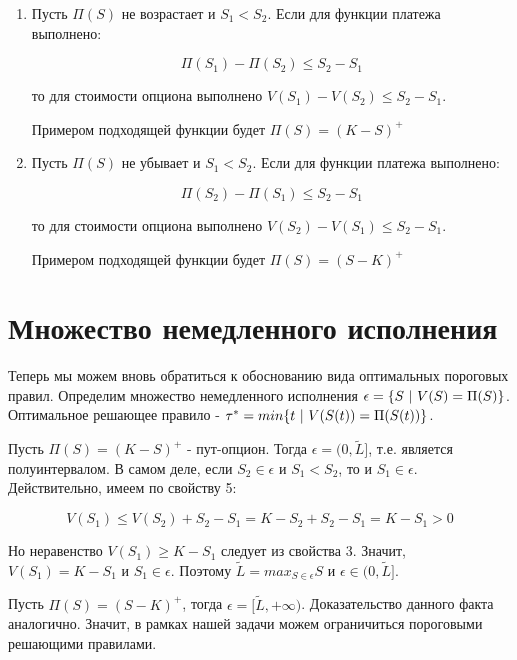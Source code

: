 \documentclass[a4paper,12pt]{article}
\theoremstyle{definition}
\begin{document}
\begin{enumerate}
    \item Пусть $\Pi (S)$ не возрастает и $S_1 < S_2$. Если для функции платежа выполнено:

    \begin{equation*}
        \Pi (S_1) - \Pi (S_2) \le S_2 - S_1
    \end{equation*}
    
    то для стоимости опциона выполнено $V (S_1) - V (S_2) \le S_2 - S_1$.
    
    Примером подходящей функции будет $\Pi (S) = (K - S)^{+}$
    
    \item Пусть $\Pi (S)$ не убывает и $S_1 < S_2$. Если для функции платежа выполнено:

    \begin{equation*}
        \Pi (S_2) - \Pi (S_1) \le S_2 - S_1
    \end{equation*}
    
    то для стоимости опциона выполнено $V (S_2) - V (S_1) \le S_2 - S_1$.
    
    Примером подходящей функции будет $\Pi (S) = (S - K)^{+}$
\end{enumerate}

\section{Множество немедленного исполнения}

Теперь мы можем вновь обратиться к обоснованию вида оптимальных пороговых правил. Определим множество немедленного исполнения $\epsilon = \{S\textup{ | }V(S) = \Pi (S)\}$. Оптимальное решающее правило - $\tau^{*} = min \{t\textup{ | }V(S(t)) = \Pi (S(t)) \}$.

Пусть $\Pi (S) = (K - S)^{+}$ - пут-опцион. Тогда $\epsilon = (0, \tilde{L}]$, т.е. является полуинтервалом. В самом деле, если $S_2 \in \epsilon$ и $S_1 < S_2$, то и $S_1 \in \epsilon$. Действительно, имеем по свойству 5:

\begin{equation*}
    V (S_1) \le V(S_2) + S_2 - S_1 = K - S_2 + S_2 - S_1 = K - S_1 > 0
\end{equation*}

Но неравенство $V(S_1) \ge K - S_1$ следует из свойства 3. Значит, $V(S_1) = K - S_1$ и $S_1 \in \epsilon$. Поэтому $\tilde{L} = max_{S \in \epsilon} S$ и $\epsilon \in (0, \tilde{L}]$.

Пусть $\Pi (S) = (S - K)^{+}$, тогда $\epsilon = [\tilde{L}, +\infty)$. Доказательство данного факта аналогично. Значит, в рамках нашей задачи можем ограничиться пороговыми решающими правилами.
\end{document}
